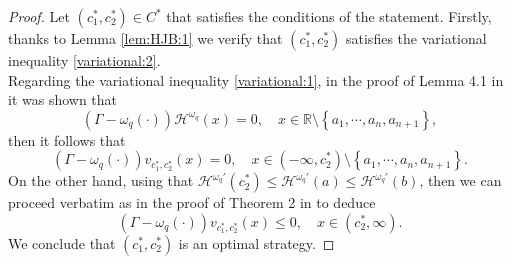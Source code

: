 \documentclass[10pt,a4paper]{amsart}
\newcommand{\reals}{\mathbb{R}}
\newcommand{\cH}{\mathcal{H}}
\newcommand{\homega}{\omega_q}
\newcommand{\BRA}[1]{{{\left\{#1\right\}}}} %
\renewcommand{\leq}{\leqslant}
\begin{document}
\begin{proof}
	Let $(c_1^\ast,c_2^\ast) \in C^\ast$ that satisfies the conditions of the statement. Firstly, thanks to Lemma \ref{lem:HJB:1} we verify that $(c_1^\ast,c_2^\ast)$ satisfies the variational inequality \eqref{variational:2}.\\
	Regarding the variational inequality \eqref{variational:1}, in the proof of Lemma 4.1 in \cite{mata-renaud_2024} it was shown that
	\[
	(\Gamma - \homega(\cdot)) \cH^{\homega}(x) = 0, \quad x \in \reals\setminus\BRA{a_1,\cdots,a_n,a_{n+1}},
	\]
	then it follows that
	\[
	(\Gamma - \homega(\cdot)) v_{c_1^\ast,c_2^\ast}(x) = 0, \quad x \in (-\infty,c_2^\ast)\setminus\BRA{a_1,\cdots,a_n,a_{n+1}}.
	\]
	On the other hand, using that $\cH^{\homega\prime}(c_2^\ast) \leq \cH^{\homega\prime}(a) \leq \cH^{\homega\prime}(b)$, then we can proceed verbatim as in the proof of Theorem 2 in \cite{loeffen_2008} to deduce
	\[
	(\Gamma - \homega(\cdot)) v_{c_1^\ast,c_2^\ast}(x) \leq 0, \quad x \in (c_2^\ast,\infty).
	\]
	We conclude that $(c_1^\ast,c_2^\ast)$ is an optimal strategy.
\end{proof}
\end{document}
